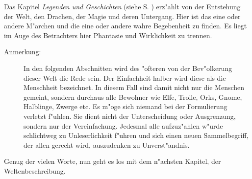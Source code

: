 \par Das Kapitel \textit{Legenden und Geschichten} (siehe S. \pageref{legendenundgeschichten}) erz"ahlt von der Entstehung der Welt, den Drachen, der Magie und deren Untergang. Hier ist das eine oder andere M"archen und die eine oder andere wahre Begebenheit zu finden. Es liegt im Auge des Betrachters hier Phantasie und Wirklichkeit zu trennen.


\begin{description}
\item[Anmerkung:]In den folgenden Abschnitten wird des "ofteren von der Bev"olkerung dieser Welt die Rede sein. Der Einfachheit halber wird diese als \glqq die Menschheit\grqq{} bezeichnet. In diesem Fall sind damit nicht nur die Menschen gemeint, sondern durchaus alle Bewohner wie Elfe, Trolle, Orks, Gnome, Halblinge, Zwerge etc. Es m"oge sich niemand bei der Formulierung verletzt f"uhlen. Sie dient nicht der Unterscheidung oder Ausgrenzung, sondern nur der Vereinfachung. Jedesmal alle aufzuz"ahlen w"urde schlichtweg zu Unleserlichkeit f"uhren und sich einen neuen Sammelbegriff, der allen gerecht wird, auszudenken zu Unverst"andnis.
\end{description}

\par Genug der vielen Worte, nun geht es los mit dem n"achsten Kapitel, der Weltenbeschreibung.
